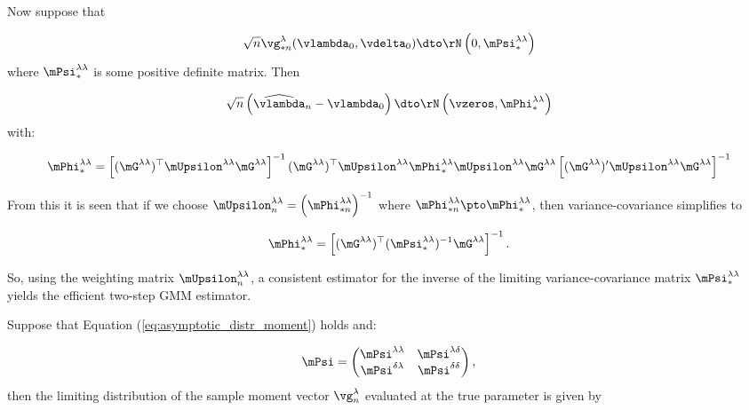 \documentclass[english,12pt]{book}\usepackage[]{graphicx}\usepackage[]{xcolor}
\begin{document}
Now suppose that 

\begin{equation*}
\sqrt{n}\vg_{*n}^{\lambda}(\vlambda_0, \vdelta_0) \dto \rN\left(0, \mPsi^{\lambda\lambda}_{*}\right) 
\end{equation*}
%
where $\mPsi^{\lambda\lambda}_{*}$ is some positive definite matrix. Then

\begin{equation*}
\sqrt{n}\left(\widehat{\vlambda}_n - \vlambda_0\right)\dto \rN\left(\vzeros, \mPhi_{*}^{\lambda\lambda}\right)
\end{equation*}
%
with:

\begin{equation*}
\mPhi_{*}^{\lambda\lambda} = \left[(\mG^{\lambda\lambda})^\top\mUpsilon^{\lambda\lambda}\mG^{\lambda\lambda}\right]^{-1}(\mG^{\lambda\lambda})^\top\mUpsilon^{\lambda\lambda}\mPhi_{*}^{\lambda\lambda}\mUpsilon^{\lambda\lambda}\mG^{\lambda\lambda}\left[(\mG^{\lambda\lambda})'\mUpsilon^{\lambda\lambda}\mG^{\lambda\lambda}\right]^{-1}
\end{equation*}

From this it is seen that if we choose $\mUpsilon_n^{\lambda\lambda} = \left(\mPhi_{*n}^{\lambda\lambda}\right)^{-1}$ where $\mPhi_{*n}^{\lambda\lambda}\pto \mPhi_{*}^{\lambda\lambda}$, then variance-covariance simplifies to

\begin{equation*}
\mPhi_{*}^{\lambda\lambda} = \left[(\mG^{\lambda\lambda})^\top(\mPsi^{\lambda\lambda}_{*})^{-1}\mG^{\lambda\lambda}\right]^{-1}.
\end{equation*}

So, using the weighting matrix $\mUpsilon_n^{\lambda\lambda}$, a consistent estimator for the inverse of the limiting variance-covariance matrix $\mPsi_{*}^{\lambda\lambda}$ yields the efficient two-step GMM estimator.


Suppose that Equation (\ref{eq:asymptotic_distr_moment}) holds and:

\begin{equation*}
	\mPsi = \begin{pmatrix}
	\mPsi^{\lambda\lambda} & \mPsi^{\lambda\delta} \\
	\mPsi^{\delta\lambda} & \mPsi^{\delta\delta}
	\end{pmatrix},
\end{equation*}
%
then the limiting distribution of the sample moment vector $\vg_n^{\lambda}$ evaluated at the true parameter is given by
\end{document}

